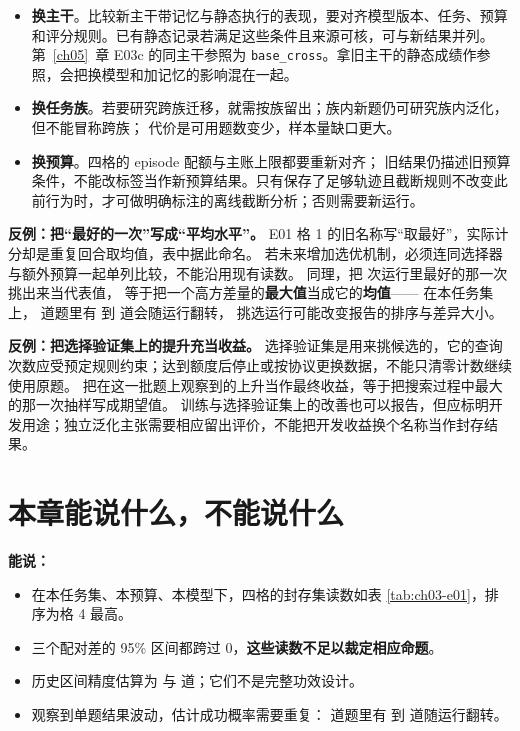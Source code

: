 \begin{itemize}
  \item \begin{sloppypar}\textbf{换主干}。比较新主干带记忆与静态执行的表现，要对齐模型版本、任务、预算和评分规则。已有静态记录若满足这些条件且来源可核，可与新结果并列。第~\ref{ch05}~章 E03c 的同主干参照为 \texttt{base\_cross}。拿旧主干的静态成绩作参照，会把换模型和加记忆的影响混在一起。\end{sloppypar}
  \item \textbf{换任务族}。若要研究跨族迁移，就需按族留出；族内新题仍可研究族内泛化，但不能冒称跨族；
        代价是可用题数变少，样本量缺口更大。
  \item \textbf{换预算}。四格的 episode 配额与主账上限都要重新对齐；
        旧结果仍描述旧预算条件，不能改标签当作新预算结果。只有保存了足够轨迹且截断规则不改变此前行为时，才可做明确标注的离线截断分析；否则需要新运行。
\end{itemize}

\begin{pitfallbox}
\textbf{反例：把“最好的一次”写成“平均水平”。}
E01 格 1 的旧名称写“取最好”，实际计分却是重复回合取均值，表中据此命名。
若未来增加选优机制，必须连同选择器与额外预算一起单列比较，不能沿用现有读数。
同理，把  次运行里最好的那一次挑出来当代表值，
等于把一个高方差量的\textbf{最大值}当成它的\textbf{均值}——
在本任务集上， 道题里有  到  道会随运行翻转，
挑选运行可能改变报告的排序与差异大小。
\end{pitfallbox}

\begin{pitfallbox}
\textbf{反例：把选择验证集上的提升充当收益。}
选择验证集是用来挑候选的，它的查询次数应受预定规则约束；达到额度后停止或按协议更换数据，不能只清零计数继续使用原题。
把在这一批题上观察到的上升当作最终收益，等于把搜索过程中最大的那一次抽样写成期望值。
训练与选择验证集上的改善也可以报告，但应标明开发用途；独立泛化主张需要相应留出评价，不能把开发收益换个名称当作封存结果。
\end{pitfallbox}

\section{本章能说什么，不能说什么}
\label{sec:ch03-claims}

\begin{sloppypar}
\textbf{能说：}
\end{sloppypar}
\begin{itemize}
  \item 在本任务集、本预算、本模型下，四格的封存集读数如表 \ref{tab:ch03-e01}，排序为格 4 最高。
  \item 三个配对差的 95\% 区间都跨过 0，\textbf{这些读数不足以裁定相应命题}。
  \item 历史区间精度估算为  与  道；它们不是完整功效设计。
  \item 观察到单题结果波动，估计成功概率需要重复： 道题里有  到  道随运行翻转。
\end{itemize}

